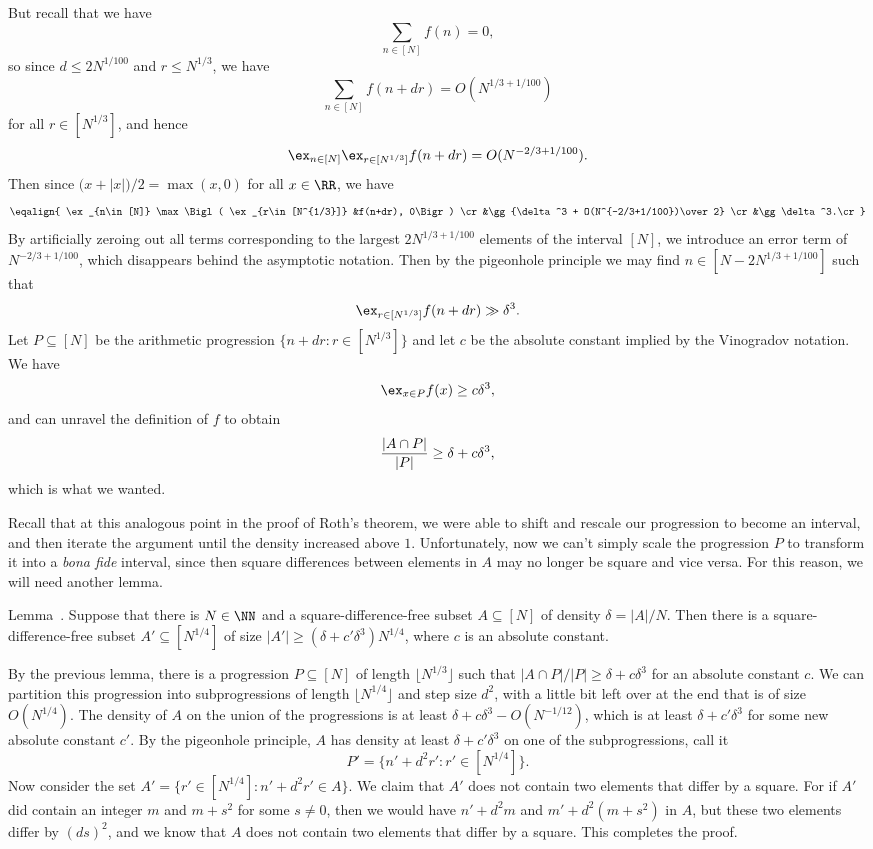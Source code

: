 But recall that we have
$$\sum_{n\in [N]} f(n) = 0,$$
so since $d \le 2N^{1/100}$ and $r\le N^{1/3}$, we have
$$\sum_{n\in [N]} f(n+dr) = O(N^{1/3+ 1/100})$$
for all $r\in [N^{1/3}]$, and hence
$$\ex_{n\in [N]} \ex_{r\in [N^{1/3}]} f(n+dr) = O(N^{-2/3+ 1/100}).$$
Then since $\bigl(x+|x|\bigr)/2 = \max(x,0)$ for all $x\in \RR$, we have
$$ \eqalign{
\ex_{n\in [N]} \max\Bigl( \ex_{r\in [N^{1/3}]} &f(n+dr), 0\Bigr) \cr
&\gg {\delta^3 + O(N^{-2/3+1/100})\over 2} \cr
&\gg \delta^3.\cr
}$$
By artificially zeroing out all terms corresponding to the largest $2N^{1/3+1/100}$ elements of the interval $[N]$,
we introduce an error
term of $N^{-2/3+1/100}$, which disappears behind the asymptotic notation.
Then by the pigeonhole principle we may find $n\in [N-2N^{1/3+1/100}]$ such that
$$\ex_{r\in [N^{1/3}]} f(n+dr) \gg \delta^3.$$
Let $P\subseteq [N]$ be the arithmetic progression $\bigl\{n + dr : r\in [N^{1/3}]\bigr\}$ and let
$c$ be the absolute constant implied by the Vinogradov notation. We have
$$\ex_{x\in P} f(x) \ge c\delta ^3,$$
and can unravel the definition of $f$ to obtain
$${|A\cap P|\over |P|} \ge \delta + c\delta^3,$$
which is what we wanted.\slug

Recall that at this analogous point in the proof of Roth's theorem, we were able to shift and
rescale our progression to become an interval, and then iterate the argument until the density
increased above $1$. Unfortunately,
now we can't simply scale the progression $P$ to transform it into a {\it bona fide} interval, since then
square differences between elements in $A$ may no longer be square and vice versa. For
this reason, we will need another lemma.

\edef\lemfurstenbergsarkozy{\the\thmcount}
\proclaim Lemma~\advthm.
Suppose that there is $N\in \NN$ and a square-difference-free
subset $A\subseteq [N]$ of density $\delta = |A|/N$. Then there is a square-difference-free
subset $A'\subseteq [N^{1/4}]$
of size $|A'| \ge (\delta + c'\delta^3) N^{1/4}$, where $c$ is an absolute constant.

\proof By the previous lemma, there is a progression $P\subseteq [N]$ of length $\lfloor N^{1/3}\rfloor$
such that $|A\cap P|/|P| \ge \delta + c\delta^3$ for an absolute
constant $c$. We can partition this progression into subprogressions of length $\lfloor N^{1/4}\rfloor$
and step size $d^2$, with a little bit left over at the end that is of size $O(N^{1/4})$. The density
of $A$ on the union of the progressions is at least $\delta + c\delta^3 - O(N^{-1/12})$,
which is at least $\delta + c'\delta^3$ for some new absolute constant $c'$. By the pigeonhole principle,
$A$ has density at least $\delta + c'\delta^3$ on one of the subprogressions, call it
$$P' = \bigl\{ n' + d^2r' : r'\in [N^{1/4}]\bigr\}.$$
Now consider the set $A' = \bigl\{ r'\in [N^{1/4}] : n' + d^2 r'\in A\bigr\}$. We claim that
$A'$ does not contain two elements that differ by a square. For if $A'$ did contain an integer $m$ and $m+s^2$
for some $s\ne 0$, then we would have $n' + d^2m$ and $m'+d^2(m+s^2)$ in
$A$, but these two elements differ by $(ds)^2$, and we know that $A$ does not contain two elements
that differ by a square. This completes the proof.\slug

